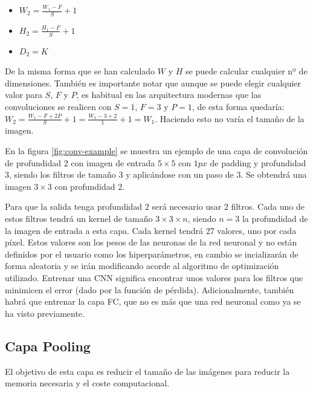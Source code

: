 \begin{itemize}
\item $W_2 = \frac{W_1 - F}{S} + 1$
\item $H_2 = \frac{H_1 - F}{S} + 1$
\item $D_2 = K$
\end{itemize}

De la misma forma que se han calculado $W$ y $H$ se puede calcular cualquier nº de dimensiones. También es importante notar que aunque se puede elegir cualquier valor para $S$, $F$ y $P$, es habitual en las arquitectura modernas que las convoluciones se realicen con $S=1$, $F=3$ y $P=1$, de esta forma quedaría: $W_2 = \frac{W_1-F+2P}{S} + 1 = \frac{W_1 - 3 + 2}{1} + 1 = W_1$. Haciendo esto no varía el tamaño de la imagen.

En la figura \ref{fig:conv-example}\cite{Li2020} se muestra un ejemplo de una capa de convolución de profundidad $2$ con imagen de entrada $5 \times 5$ con $1 px$ de padding y profundidad $3$, siendo los filtros de tamaño $3$ y aplicándose con un paso de $3$. Se obtendrá una imagen $3\times 3$ con profundidad $2$.

Para que la salida tenga profundidad $2$ será necesario usar $2$ filtros. Cada uno de estos filtros tendrá un kernel de tamaño $3\times 3 \times n$, siendo $n=3$ la profundidad de la imagen de entrada a esta capa. Cada kernel tendrá 27 valores, uno por cada píxel. Estos valores son los pesos de las neuronas de la red neuronal y no están definidos por el usuario como los hiperparámetros, en cambio se incializarán de forma aleatoria y se irán modificando acorde al algoritmo de optimización utilizado. Entrenar una CNN significa encontrar unos valores para los filtros que minimicen el error (dado por la función de pérdida). Adicionalmente, también habrá que entrenar la capa FC, que no es más que una red neuronal como ya se ha visto previamente.


\newpage\subsection{Capa Pooling}\label{cnn_capa_pooling}

El objetivo de esta capa es reducir el tamaño de las imágenes para reducir la memoria necesaria y el coste computacional.

